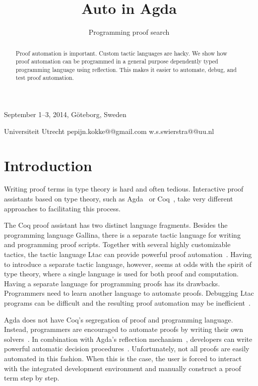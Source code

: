 \documentclass[preprint]{sigplanconf}
\begin{document}
 {September 1--3, 2014, G\"oteborg, Sweden}

\title{Auto in Agda}
\subtitle{Programming proof search}

           {Universiteit Utrecht}
           {pepijn.kokke@@gmail.com \quad w.s.swierstra@@uu.nl}

\maketitle

\begin{abstract}
  Proof automation is important. Custom tactic languages are hacky. We
  show how proof automation can be programmed in a general purpose
  dependently typed programming language using reflection. This makes
  it easier to automate, debug, and test proof automation.
\end{abstract}

\section{Introduction}
\label{sec:intro}

Writing proof terms in type theory is hard and often tedious.
Interactive proof assistants based on type theory, such as
Agda~\cite{agda} or Coq~\cite{coq}, take very different approaches to
facilitating this process.

The Coq proof assistant has two distinct language fragments. Besides
the programming language Gallina, there is a separate tactic language
for writing and programming proof scripts. Together with several
highly customizable tactics, the tactic language Ltac can provide
powerful proof automation~\cite{chlipala}. Having to introduce a
separate tactic language, however, seems at odds with the spirit of
type theory, where a single language is used for both proof and
computation.  Having a separate language for programming proofs has
its drawbacks. Programmers need to learn another language to automate
proofs. Debugging Ltac programs can be difficult and the resulting
proof automation may be inefficient~\cite{brabaint}.

Agda does not have Coq's segregation of proof and programming
language.  Instead, programmers are encouraged to automate proofs by
writing their own solvers~\cite{ulf-tphols}. In combination with
Agda's reflection mechanism~\cite{van-der-walt}, developers can write
powerful automatic decision procedures~\cite{allais}. Unfortunately,
not all proofs are easily automated in this fashion. When this is the
case, the user is forced to interact with the integrated development
environment and manually construct a proof term step by step.
\end{document}

